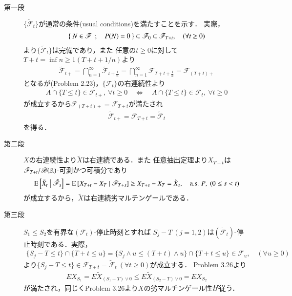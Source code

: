 	\begin{prf}\mbox{}
		\begin{description}
			\item[第一段]
				$\{\tilde{\mathscr{F}}_t\}$が通常の条件(usual conditions)を満たすことを示す．
				実際，
				\begin{align}
					\left\{\ N \in \mathscr{F}\ \, ; \quad P(N)=0\ \right\} 
					\subset \mathscr{F}_0 \subset \mathscr{F}_{T+t},
					\quad (\forall t \geq 0)
				\end{align}
				より$\{\tilde{\mathscr{F}}_t\}$は完備であり，また
				任意の$t \geq 0$に対して$T+t = \inf{n \geq 1}{(T+t+1/n)}$より
				\begin{align}
					\tilde{\mathscr{F}}_{t+}
					= \bigcap_{n=1}^\infty \tilde{\mathscr{F}}_{t+\frac{1}{n}}
					= \bigcap_{n=1}^\infty \mathscr{F}_{T+t+\frac{1}{n}}
					= \mathscr{F}_{(T+t)+}
				\end{align}
				となるが(Problem 2.23)，$\{\mathscr{F}_t\}$の右連続性より
				\begin{align}
					A \cap \{T \leq t\} \in \mathscr{F}_{t+},
					\ \forall t \geq 0
					\quad \Leftrightarrow \quad
					A \cap \{T \leq t\} \in \mathscr{F}_t,
					\ \forall t \geq 0
				\end{align}
				が成立するから$\mathscr{F}_{(T+t)+} = \mathscr{F}_{T+t}$が満たされ
				\begin{align}
					\tilde{\mathscr{F}}_{t+} = \mathscr{F}_{T+t} = \tilde{\mathscr{F}}_{t}
				\end{align}
				を得る．
				
			\item[第二段]
				$X$の右連続性より$\tilde{X}$は右連続である．また
				任意抽出定理より$X_{T+t}$は$\mathscr{F}_{T+t}/\mathscr{B}(\mathbb{R})$-可測かつ可積分であり
				\begin{align}
					\operatorname{E} \left[ \tilde{X}_t \ \middle|\ \tilde{\mathscr{F}}_s \right]
					= \operatorname{E} \left[ X_{T+t} - X_T \ \middle|\ \mathscr{F}_{T+s} \right]
					\geq X_{T+s} - X_T
					= \tilde{X}_s,
					\quad \mbox{a.s. $P$},
					\ (0 \leq s < t)
				\end{align}
				が成立するから，$\tilde{X}$は右連続劣マルチンゲールである．
				
			\item[第三段]
				$S_1 \leq S_2$を有界な$(\mathscr{F}_t)$-停止時刻とすれば
				$S_j - T\ (j=1,2)$は$(\tilde{\mathscr{F}}_t)$-停止時刻である．実際，
				\begin{align}
					\{S_j - T \leq t\} \cap \{T+t \leq u\}
					= \{S_j \wedge u \leq (T+t) \wedge u\} \cap \{T+t \leq u\}
					\in \mathscr{F}_u,
					\quad (\forall u \geq 0)
				\end{align}
				より$\{S_j - T \leq t\} \in \mathscr{F}_{T+t} = \tilde{\mathscr{F}}_t\ (\forall t \geq 0)$が成立する．
				Problem 3.26より
				\begin{align}
					EX_{S_1} 
					= E \tilde{X}_{(S_1 - T) \vee 0} 
					\leq E \tilde{X}_{(S_2 - T) \vee 0}
					= EX_{S_2}
				\end{align}
				が満たされ，同じくProblem 3.26より$X$の劣マルチンゲール性が従う．
				\QED
		\end{description}
	\end{prf}
	

